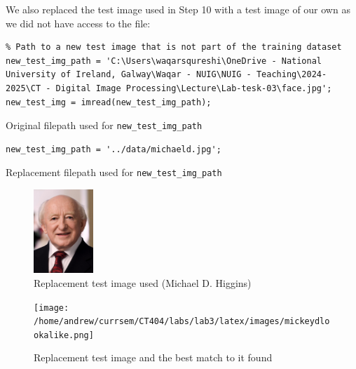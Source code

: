 \documentclass[a4paper]{article}
\newenvironment{code}{\captionsetup{type=listing}}{}
\begin{document}
We also replaced the test image used in Step 10 with a test image of our own as we did not have access to the file:
\begin{code}
\begin{verbatim}
% Path to a new test image that is not part of the training dataset
new_test_img_path = 'C:\Users\waqarsqureshi\OneDrive - National University of Ireland, Galway\Waqar - NUIG\NUIG - Teaching\2024-2025\CT - Digital Image Processing\Lecture\Lab-tesk-03\face.jpg';
new_test_img = imread(new_test_img_path);
\end{verbatim}
\caption{Original filepath used for \texttt{new_test_img_path}}
\end{code}

\begin{code}
\begin{verbatim}
new_test_img_path = '../data/michaeld.jpg';
\end{verbatim}
\caption{Replacement filepath used for \texttt{new_test_img_path}}
\end{code}

\begin{figure}[H]
    \centering
    \includegraphics[width=0.2\textwidth]{./images/mickeyd.jpg}
    \caption{Replacement test image used (Michael D. Higgins)}
\end{figure}

\begin{figure}[H]
    \centering
    \texttt{[image: /home/andrew/currsem/CT404/labs/lab3/latex/images/mickeydlookalike.png]}
    \caption{Replacement test image and the best match to it found}
\end{figure}
\end{document}
